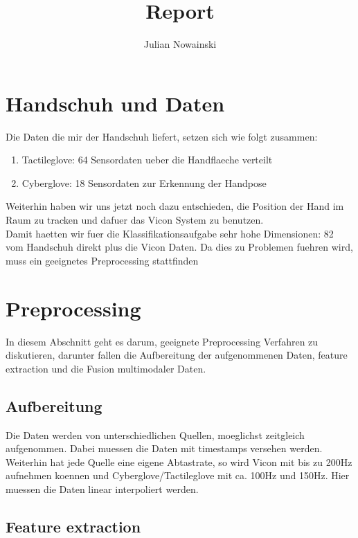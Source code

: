 \documentclass[]{report}
\title{Report}
\author{Julian Nowainski}
\begin{document}
\maketitle

\section*{Handschuh und Daten}
Die Daten die mir der Handschuh liefert, setzen sich wie folgt zusammen:
\begin{enumerate}
\item Tactileglove: 64 Sensordaten ueber die Handflaeche verteilt
\item Cyberglove: 18 Sensordaten zur Erkennung der Handpose
\end{enumerate}
Weiterhin haben wir uns jetzt noch dazu entschieden, die Position der Hand im Raum zu tracken und dafuer das Vicon System zu benutzen. \\
Damit haetten wir fuer die Klassifikationsaufgabe sehr hohe Dimensionen: 82 vom Handschuh direkt plus die Vicon Daten. Da dies zu Problemen fuehren wird, muss ein geeignetes Preprocessing stattfinden

\section*{Preprocessing}
In diesem Abschnitt geht es darum, geeignete Preprocessing Verfahren zu diskutieren, darunter fallen die Aufbereitung der aufgenommenen Daten, feature extraction und die Fusion multimodaler Daten.

\subsection*{Aufbereitung}
Die Daten werden von unterschiedlichen Quellen, moeglichst zeitgleich aufgenommen. Dabei muessen die Daten mit timestamps versehen werden. Weiterhin hat jede Quelle eine eigene Abtastrate, so wird Vicon mit bis zu 200Hz aufnehmen koennen und Cyberglove/Tactileglove mit ca. 100Hz und 150Hz. Hier muessen die Daten linear interpoliert werden.

\subsection*{Feature extraction}
\end{document}
